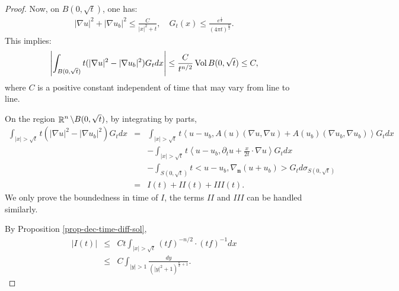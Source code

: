 \documentclass[a4paper,11pt,reqno]{amsart}
\def\vol{\mathop{\rm vol}\nolimits}
\def\vol{\mathop{\rm Vol}\nolimits}
\def\vol{\mathop{\rm vol}\nolimits}
\def\vol{\mathop{\rm Vol}\nolimits}
\def\R{\mathop{\rm \mathbb{R}}\nolimits}
\begin{document}
\begin{proof}
Now, on $B(0,\sqrt{t})$, one has:
\begin{eqnarray*}
|\nabla u|^2+|\nabla u_b|^2\leq \frac{C}{|x|^2+t},\quad G_t(x)\leq \frac{e^{\frac{1}{4}}}{(4\pi t)^{\frac{n}{2}}}.
\end{eqnarray*}
This implies:
\begin{eqnarray*}
\left|\int_{B(0,\sqrt{t})}t(|\nabla u|^2-|\nabla u_b|^2)G_tdx\right|\leq\frac{C}{t^{n/2}}\vol B(0,\sqrt{t})\leq C,
\end{eqnarray*}
where $C$ is a positive constant independent of time that may vary from line to line. 

On the region $\R^n\setminus B(0,\sqrt{t})$, by integrating by parts,
\begin{eqnarray*}
\int_{|x|>\sqrt{t}}t(|\nabla u|^2-|\nabla u_b|^2)G_tdx&=&\int_{|x|>\sqrt{t}}t\left<u-u_b,A(u)(\nabla u,\nabla u)+A(u_b)(\nabla u_b,\nabla u_b)\right>G_tdx\\
&&-\int_{|x|>\sqrt{t}}t\left<u-u_b,\partial_tu+\frac{x}{2t}\cdot\nabla u\right>G_tdx\\
&&-\int_{S(0,\sqrt{t})}t<u-u_b,\nabla_{\mathbf{n}}(u+u_b)>G_td\sigma_{S(0,\sqrt{t})}\\
&=&I(t)+II(t)+III(t).
\end{eqnarray*}
We only prove the boundedness in time of $I$, the terms $II$ and $III$ can be handled similarly.

By Proposition \ref{prop-dec-time-diff-sol}, 
\begin{eqnarray*}
|I(t)|&\leq& Ct\int_{|x|>\sqrt{t}}(tf)^{-n/2}\cdot (tf)^{-1}dx\\
&\leq& C\int_{|y|>1}\frac{dy}{(|y|^2+1)^{\frac{n}{2}+1}}.
\end{eqnarray*}

\end{proof}
\end{document}
